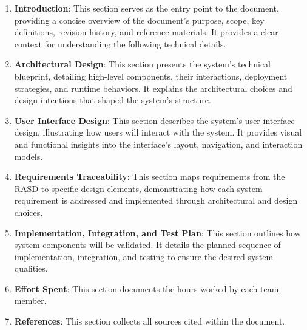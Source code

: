 \begin{enumerate}
    \item \textbf{Introduction}: This section serves as the entry point to the document, providing a concise overview
          of the document's purpose, scope, key definitions, revision history, and reference materials. It provides a
          clear context for understanding the following technical details.
    \item \textbf{Architectural Design}: This section presents the system's technical blueprint, detailing high-level
          components, their interactions, deployment strategies, and runtime behaviors. It explains the architectural
          choices and design intentions that shaped the system's structure.
    \item \textbf{User Interface Design}: This section describes the system's user interface design, illustrating how
          users will interact with the system. It provides visual and functional insights into the interface's layout,
          navigation, and interaction models.
    \item \textbf{Requirements Traceability}: This section maps requirements from the RASD to specific design elements,
          demonstrating how each system requirement is addressed and implemented through architectural and design
          choices.
          \pagebreak
    \item \textbf{Implementation, Integration, and Test Plan}: This section outlines how system components will be
          validated. It details the planned sequence of implementation, integration, and testing to ensure the desired
          system qualities.
    \item \textbf{Effort Spent}: This section documents the hours worked by each team member.
    \item \textbf{References}: This section collects all sources cited within the document.
\end{enumerate}

